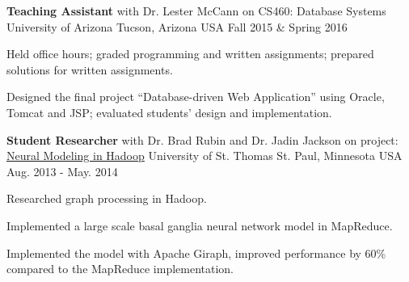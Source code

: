 \begin{cventries}
  \cventry
    {\textbf{Teaching Assistant} with Dr. Lester McCann
    on CS460: Database Systems}
    {University of Arizona} %
    {Tucson, Arizona USA} %
    {Fall 2015 \& Spring 2016} %
    {
      \begin{cvitems} %
        \item {Held office hours; graded programming and written
    assignments; prepared solutions for written assignments.}
        \item {Designed the final project ``Database-driven Web
    Application'' using Oracle, Tomcat and JSP; evaluated
    students' design and implementation.}
      \end{cvitems}
    }

  \cventry
    {\textbf{Student Researcher} with Dr. Brad Rubin and Dr. Jadin
    Jackson on project: \href{http://imsure.github.io/NeuralGiraph/}{Neural
    Modeling in Hadoop}}
    {University of St. Thomas} %
    {St. Paul, Minnesota USA} %
    {Aug. 2013 - May. 2014} %
    {
      \begin{cvitems} %
      \item {Researched graph processing in Hadoop.}
      \item {Implemented a large scale basal ganglia neural network
    model in MapReduce.}
      \item {Implemented the model
       with Apache Giraph, improved
    performance by 60\% compared to the MapReduce implementation.}
      \end{cvitems}
    }

\end{cventries}
